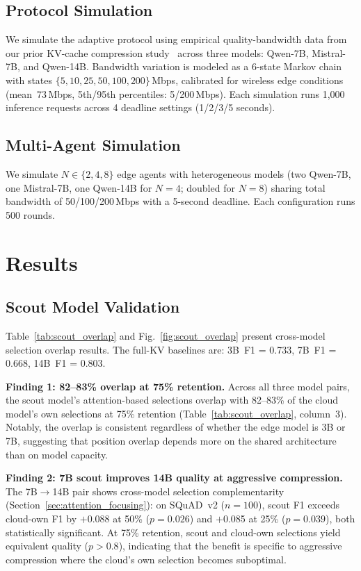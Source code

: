 \documentclass[conference]{IEEEtran}
\begin{document}
\subsection{Protocol Simulation}

We simulate the adaptive protocol using empirical quality-bandwidth data from our prior KV-cache compression study~\cite{paperA} across three models: Qwen-7B, Mistral-7B, and Qwen-14B.
Bandwidth variation is modeled as a 6-state Markov chain with states $\{5, 10, 25, 50, 100, 200\}$\,Mbps, calibrated for wireless edge conditions (mean~73\,Mbps, 5th/95th percentiles: 5/200\,Mbps).
Each simulation runs 1{,}000 inference requests across 4 deadline settings (1/2/3/5 seconds).

\subsection{Multi-Agent Simulation}

We simulate $N \in \{2, 4, 8\}$ edge agents with heterogeneous models (two Qwen-7B, one Mistral-7B, one Qwen-14B for $N = 4$; doubled for $N = 8$) sharing total bandwidth of 50/100/200\,Mbps with a 5-second deadline.
Each configuration runs 500 rounds.


\section{Results}
\label{sec:results}

\subsection{Scout Model Validation}

Table~\ref{tab:scout_overlap} and Fig.~\ref{fig:scout_overlap} present cross-model selection overlap results.
The full-KV baselines are: 3B~F1 = 0.733, 7B~F1 = 0.668, 14B~F1 = 0.803.

\textbf{Finding 1: 82--83\% overlap at 75\% retention.}
Across all three model pairs, the scout model's attention-based selections overlap with 82--83\% of the cloud model's own selections at 75\% retention (Table~\ref{tab:scout_overlap}, column~3).
Notably, the overlap is consistent regardless of whether the edge model is 3B or 7B, suggesting that position overlap depends more on the shared architecture than on model capacity.

\textbf{Finding 2: 7B scout improves 14B quality at aggressive compression.}
The 7B$\to$14B pair shows cross-model selection complementarity (Section~\ref{sec:attention_focusing}): on SQuAD~v2 ($n = 100$), scout F1 exceeds cloud-own F1 by $+$0.088 at 50\% ($p = 0.026$) and $+$0.085 at 25\% ($p = 0.039$), both statistically significant.
At 75\% retention, scout and cloud-own selections yield equivalent quality ($p > 0.8$), indicating that the benefit is specific to aggressive compression where the cloud's own selection becomes suboptimal.
\end{document}
